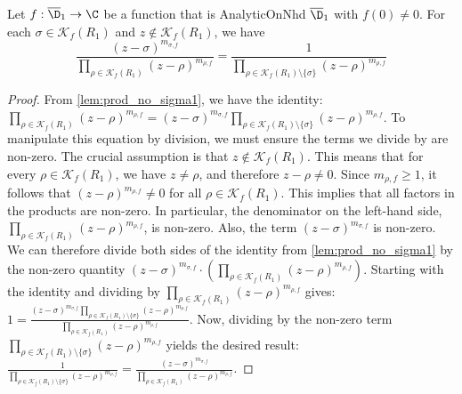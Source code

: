 \begin{lemma}\label{lem:prod_no_sigma2} \leanok {}
Let $f:\overline{\D}_1\to\C$ be a function that is AnalyticOnNhd $\overline{\D}_1$ with $f(0)\neq0$. For each $\sigma \in \mathcal{K}_f(R_1)$ and $z\notin \mathcal{K}_f(R_1)$, we have
\[\frac{(z-\sigma)^{m_{\sigma,f}}}{\prod_{\rho\in\mathcal{K}_f(R_1)}(z-\rho)^{m_{\rho,f}}} = \frac{1}{\prod_{\rho\in\mathcal{K}_f(R_1) \setminus\{\sigma\}}(z-\rho)^{m_{\rho,f}}}\]
\end{lemma}
\begin{proof}
\leanok
From \cref{lem:prod_no_sigma1}, we have the identity:
$\prod_{\rho\in\mathcal{K}_f(R_1)}(z-\rho)^{m_{\rho,f}} = (z-\sigma)^{m_{\sigma,f}} \prod_{\rho\in\mathcal{K}_f(R_1) \setminus\{\sigma\}}(z-\rho)^{m_{\rho,f}}$.
To manipulate this equation by division, we must ensure the terms we divide by are non-zero.
The crucial assumption is that $z \notin \mathcal{K}_f(R_1)$. This means that for every $\rho \in \mathcal{K}_f(R_1)$, we have $z \neq \rho$, and therefore $z-\rho \neq 0$.
Since $m_{\rho,f} \ge 1$, it follows that $(z-\rho)^{m_{\rho,f}} \neq 0$ for all $\rho \in \mathcal{K}_f(R_1)$.
This implies that all factors in the products are non-zero. In particular, the denominator on the left-hand side, $\prod_{\rho\in\mathcal{K}_f(R_1)}(z-\rho)^{m_{\rho,f}}$, is non-zero. Also, the term $(z-\sigma)^{m_{\sigma,f}}$ is non-zero.
We can therefore divide both sides of the identity from \cref{lem:prod_no_sigma1} by the non-zero quantity $(z-\sigma)^{m_{\sigma,f}} \cdot \left(\prod_{\rho\in\mathcal{K}_f(R_1)}(z-\rho)^{m_{\rho,f}}\right)$.
Starting with the identity and dividing by $\prod_{\rho\in\mathcal{K}_f(R_1)}(z-\rho)^{m_{\rho,f}}$ gives:
$1 = \frac{(z-\sigma)^{m_{\sigma,f}} \prod_{\rho\in\mathcal{K}_f(R_1) \setminus\{\sigma\}}(z-\rho)^{m_{\rho,f}}}{\prod_{\rho\in\mathcal{K}_f(R_1)}(z-\rho)^{m_{\rho,f}}}$.
Now, dividing by the non-zero term $\prod_{\rho\in\mathcal{K}_f(R_1) \setminus\{\sigma\}}(z-\rho)^{m_{\rho,f}}$ yields the desired result:
$\frac{1}{\prod_{\rho\in\mathcal{K}_f(R_1) \setminus\{\sigma\}}(z-\rho)^{m_{\rho,f}}} = \frac{(z-\sigma)^{m_{\sigma,f}}}{\prod_{\rho\in\mathcal{K}_f(R_1)}(z-\rho)^{m_{\rho,f}}}$.
\end{proof}

